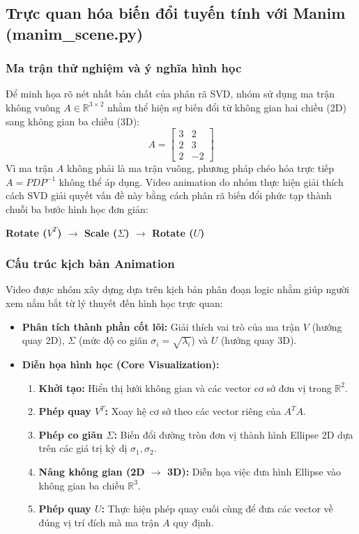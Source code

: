 \documentclass[a4paper,12pt]{article}
\begin{document}
\subsection{Trực quan hóa biến đổi tuyến tính với Manim (manim\_scene.py)}

\subsubsection{Ma trận thử nghiệm và ý nghĩa hình học}
Để minh họa rõ nét nhất bản chất của phân rã SVD, nhóm sử dụng ma trận không vuông $A \in \mathbb{R}^{3 \times 2}$ nhằm thể hiện sự biến đổi từ không gian hai chiều (2D) sang không gian ba chiều (3D):
\[
A = \begin{bmatrix}
3 & 2 \\
2 & 3 \\
2 & -2
\end{bmatrix}
\]
Vì ma trận $A$ không phải là ma trận vuông, phương pháp chéo hóa trực tiếp $A = PDP^{-1}$ không thể áp dụng. Video animation do nhóm thực hiện giải thích cách SVD giải quyết vấn đề này bằng cách phân rã biến đổi phức tạp thành chuỗi ba bước hình học đơn giản: 
\begin{center}
    \textbf{Rotate ($V^T$) $\rightarrow$ Scale ($\Sigma$) $\rightarrow$ Rotate ($U$)}
\end{center}

\subsubsection{Cấu trúc kịch bản Animation}
Video được nhóm xây dựng dựa trên kịch bản phân đoạn logic nhằm giúp người xem nắm bắt từ lý thuyết đến hình học trực quan:
\begin{itemize}
    \item \textbf{Phân tích thành phần cốt lõi:} Giải thích vai trò của ma trận $V$ (hướng quay 2D), $\Sigma$ (mức độ co giãn $\sigma_i = \sqrt{\lambda_i}$) và $U$ (hướng quay 3D).
    \item \textbf{Diễn họa hình học (Core Visualization):} 
    \begin{enumerate}
        \item \textbf{Khởi tạo:} Hiển thị lưới không gian và các vector cơ sở đơn vị trong $\mathbb{R}^2$.
        \item \textbf{Phép quay $V^T$:} Xoay hệ cơ sở theo các vector riêng của $A^TA$.
        \item \textbf{Phép co giãn $\Sigma$:} Biến đổi đường tròn đơn vị thành hình Ellipse 2D dựa trên các giá trị kỳ dị $\sigma_1, \sigma_2$.
        \item \textbf{Nâng không gian (2D $\rightarrow$ 3D):} Diễn họa việc đưa hình Ellipse vào không gian ba chiều $\mathbb{R}^3$.
        \item \textbf{Phép quay $U$:} Thực hiện phép quay cuối cùng để đưa các vector về đúng vị trí đích mà ma trận $A$ quy định.
    \end{enumerate}
\end{itemize}
\end{document}
